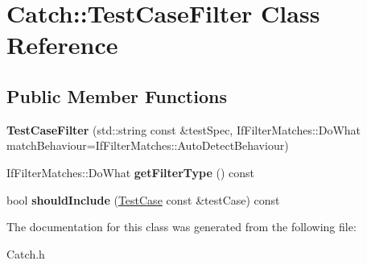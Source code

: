 \hypertarget{class_catch_1_1_test_case_filter}{\section{Catch\-:\-:Test\-Case\-Filter Class Reference}
\label{class_catch_1_1_test_case_filter}
}
\subsection*{Public Member Functions}
\begin{DoxyCompactItemize}
\item 
\hypertarget{class_catch_1_1_test_case_filter_a834f4aaf94f6d4dab0c43db2425e533b}{{\bfseries Test\-Case\-Filter} (std\-::string const \&test\-Spec, If\-Filter\-Matches\-::\-Do\-What match\-Behaviour=If\-Filter\-Matches\-::\-Auto\-Detect\-Behaviour)}\label{class_catch_1_1_test_case_filter_a834f4aaf94f6d4dab0c43db2425e533b}

\item 
\hypertarget{class_catch_1_1_test_case_filter_a27d4b3e5d04034f2bcbb1f070fb55412}{If\-Filter\-Matches\-::\-Do\-What {\bfseries get\-Filter\-Type} () const }\label{class_catch_1_1_test_case_filter_a27d4b3e5d04034f2bcbb1f070fb55412}

\item 
\hypertarget{class_catch_1_1_test_case_filter_a4af367b82ecf4f14d52ad969dcdf0364}{bool {\bfseries should\-Include} (\hyperlink{class_catch_1_1_test_case}{Test\-Case} const \&test\-Case) const }\label{class_catch_1_1_test_case_filter_a4af367b82ecf4f14d52ad969dcdf0364}

\end{DoxyCompactItemize}


The documentation for this class was generated from the following file\-:\begin{DoxyCompactItemize}
\item 
Catch.\-h\end{DoxyCompactItemize}
